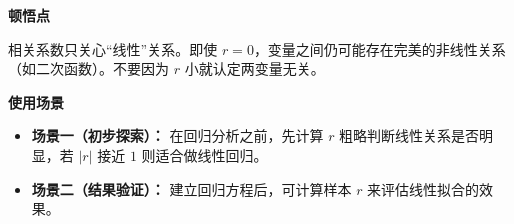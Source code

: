 \begin{explanationbox}
	\medskip
	\textbf{\textcolor{CExplanation}{顿悟点}}

	相关系数只关心“线性”关系。即使 $r=0$，变量之间仍可能存在完美的非线性关系（如二次函数）。不要因为 $r$ 小就认定两变量无关。

	\medskip
	\textbf{\textcolor{CExplanation}{使用场景}}
	\begin{itemize}[leftmargin=*, itemsep=0.5em, topsep=0.4em]
		\item \textbf{场景一（初步探索）：} 在回归分析之前，先计算 $r$ 粗略判断线性关系是否明显，若 $|r|$ 接近 $1$ 则适合做线性回归。

		\item \textbf{场景二（结果验证）：} 建立回归方程后，可计算样本 $r$ 来评估线性拟合的效果。
	\end{itemize}
\end{explanationbox}

